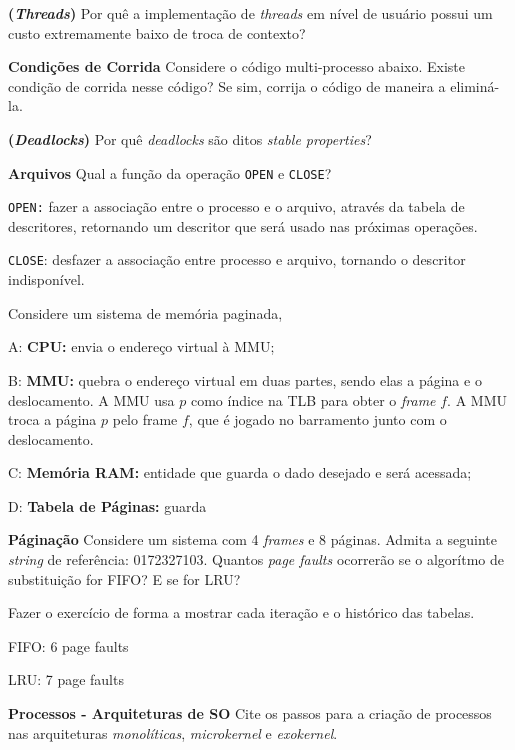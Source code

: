 \textbf{(\textit{Threads})} Por quê a implementação de \textit{threads} em nível de usuário possui um custo extremamente baixo de troca de contexto?


\textbf{Condições de Corrida} Considere o código multi-processo abaixo. Existe condição de corrida nesse código? Se sim, corrija o código de maneira a eliminá-la.


\textbf{(\textit{Deadlocks})} Por quê \textit{deadlocks} são ditos \textit{stable properties}?


\textbf{Arquivos} Qual a função da operação \texttt{OPEN} e \texttt{CLOSE}?

\texttt{OPEN:} fazer a associação entre o processo e o arquivo, através da tabela de descritores, retornando um descritor que será usado nas próximas operações.

\texttt{CLOSE}: desfazer a associação entre processo e arquivo, tornando o descritor indisponível.

\textbf{} Considere um sistema de memória paginada,

A: \textbf{CPU:} envia o endereço virtual à MMU;

B: \textbf{MMU:} quebra o endereço virtual em duas partes, sendo elas a página e o deslocamento. A MMU usa $p$ como índice na TLB para obter o \textit{frame} $f$. A MMU troca a página $p$ pelo frame $f$, que é jogado no barramento junto com o deslocamento.

C: \textbf{Memória RAM:} entidade que guarda o dado desejado e será acessada;

D: \textbf{Tabela de Páginas:} guarda


\textbf{Páginação} Considere um sistema com 4 \textit{frames} e 8 páginas. Admita a seguinte \textit{string} de referência: 0172327103. Quantos \textit{page faults} ocorrerão se o algorítmo de substituição for FIFO? E se for LRU?

Fazer o exercício de forma a mostrar cada iteração e o histórico das tabelas.

FIFO: 6 page faults

LRU: 7 page faults



\textbf{Processos - Arquiteturas de SO} Cite os passos para a criação de processos nas arquiteturas \textit{monolíticas}, \textit{microkernel} e \textit{exokernel}.


